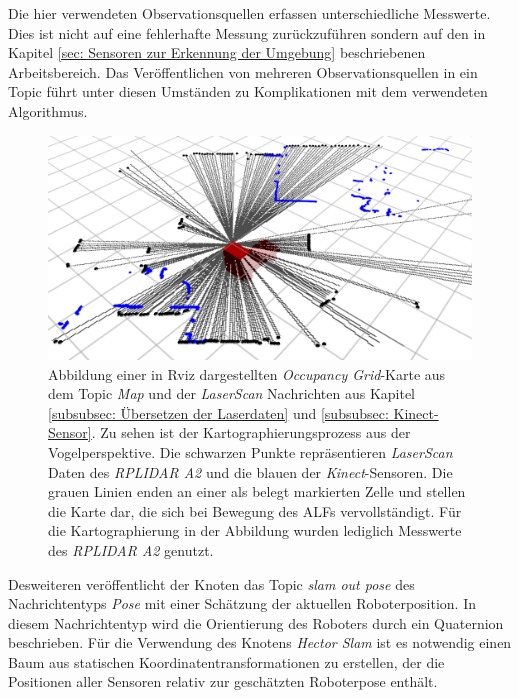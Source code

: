 		   		Die hier verwendeten Observationsquellen erfassen unterschiedliche Messwerte. Dies ist nicht auf eine fehlerhafte Messung zurückzuführen sondern auf den in Kapitel \ref{sec: Sensoren zur Erkennung der Umgebung} beschriebenen Arbeitsbereich. Das Veröffentlichen von mehreren Observationsquellen in ein Topic führt unter diesen Umständen zu Komplikationen mit dem verwendeten Algorithmus.
		   		
		   		
		   		\begin{figure}[H]
		   			\centering
		   			\includegraphics[width=1.0\textwidth]{Bilder/hector}
		   			\caption{Abbildung einer in Rviz dargestellten \textit{Occupancy Grid}-Karte aus dem Topic \textit{Map} und der \textit{LaserScan} Nachrichten aus Kapitel \ref{subsubsec: Übersetzen der Laserdaten} und \ref{subsubsec: Kinect-Sensor}. Zu sehen ist der Kartographierungsprozess aus der Vogelperspektive. Die schwarzen Punkte repräsentieren \textit{LaserScan} Daten des \textit{RPLIDAR A2} und die blauen der \textit{Kinect}-Sensoren. Die grauen Linien enden an einer als belegt markierten Zelle und stellen die Karte dar, die sich bei Bewegung des ALFs vervollständigt. Für die Kartographierung in der Abbildung wurden lediglich Messwerte des \textit{RPLIDAR A2} genutzt. }
		   			\label{fig: Hector}
		   		\end{figure}
		   		
		   		Desweiteren veröffentlicht der Knoten das Topic \textit{slam out pose} des Nachrichtentyps \textit{Pose} mit einer Schätzung der aktuellen Roboterposition. In diesem Nachrichtentyp wird die Orientierung des Roboters durch ein Quaternion beschrieben. Für die Verwendung des Knotens \textit{Hector Slam} ist es notwendig einen Baum aus statischen Koordinatentransformationen zu erstellen, der die Positionen aller Sensoren relativ zur geschätzten Roboterpose enthält. \cite{hectorslam}
		   		
